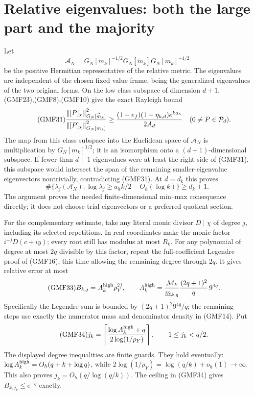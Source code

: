 \documentclass[11pt,a4paper]{article}
\begin{document}
\section{Relative eigenvalues: both the large part and the majority}

Let
\[
 \mathcal A_N=
 G_N[m_k]^{-1/2}G_N[\widetilde m_k]G_N[m_k]^{-1/2}
\]
be the positive Hermitian representative of the relative metric.
The eigenvalues are independent of the chosen fixed value frame,
being the generalized eigenvalues of the two original forms.
On the low class subspace of dimension \(d+1\),
(GMF23),(GMF8),(GMF10) give the exact Rayleigh bound
\begin{equation}\tag{GMF31}
 \frac{\left\lVert[P]_\chi\right\rVert_{G_N[\widetilde m_k]}^2}
      {\left\lVert[P]_\chi\right\rVert_{G_N[m_k]}^2}
 \ge
 \frac{(1-e_f)(1-\eta_{k,d})e^{ka_h}}{2A_d}
 \quad(0\ne P\in\mathcal P_d).
\end{equation}
The map from this class subspace into the Euclidean space of
\(\mathcal A_N\) is multiplication by \(G_N[m_k]^{1/2}\);
it is an isomorphism onto a \((d+1)\)-dimensional subspace.
If fewer than \(d+1\) eigenvalues were at least the right
side of (GMF31), this subspace would intersect the span
of the remaining smaller-eigenvalue eigenvectors nontrivially,
contradicting (GMF31).
At \(d=d_k\) this proves
\begin{equation}\tag{GMF32}
 \#\{\lambda_j(\mathcal A_N):
 \log\lambda_j\ge a_hk/2-O_h(\log k)\}\ge d_k+1.
\end{equation}
The argument proves the needed finite-dimensional min--max
consequence directly; it does not choose trial eigenvectors
or a preferred quotient section.

For the complementary estimate, take any literal monic
divisor \(D\mid\chi\) of degree \(j\), including its selected
repetitions.  In real coordinates make the monic factor
\(i^{-j}D(c+iy)\); every root still has modulus at most \(R_k\).
For any polynomial of degree at most \(2q\) divisible by
this factor, repeat the full-coefficient Legendre proof of
(GMF16), this time allowing the remaining degree through
\(2q\).  It gives relative error at most
\begin{equation}\tag{GMF33}
 B_{k,j}=A_k^{\rm high}\rho_Y^{2j},\qquad
 A_k^{\rm high}=
 \frac{\mathcal M_k}{\underline m_{k,q}}
 \frac{(2q+1)^2}{q}\,9^{4q}.
\end{equation}
Specifically the Legendre sum is bounded by
\((2q+1)^2 9^{4q}/q\); the remaining steps use exactly
the numerator mass and denominator density in (GMF14).
Put
\begin{equation}\tag{GMF34}
 j_k=\left\lceil
 \frac{\log A_k^{\rm high}+q}{2\log(1/\rho_Y)}
 \right\rceil ,
 \qquad 1\le j_k<q/2.
\end{equation}
The displayed degree inequalities are finite guards.
They hold eventually: \(\log A_k^{\rm high}=O_h(q+k+\log q)\),
while
\(2\log(1/\rho_Y)=\log(q/k)+o_h(1)\to\infty\).
This also proves
\(j_k=O_h(q/\log(q/k))\).
The ceiling in (GMF34) gives \(B_{k,j_k}\le e^{-q}\) exactly.
\end{document}
